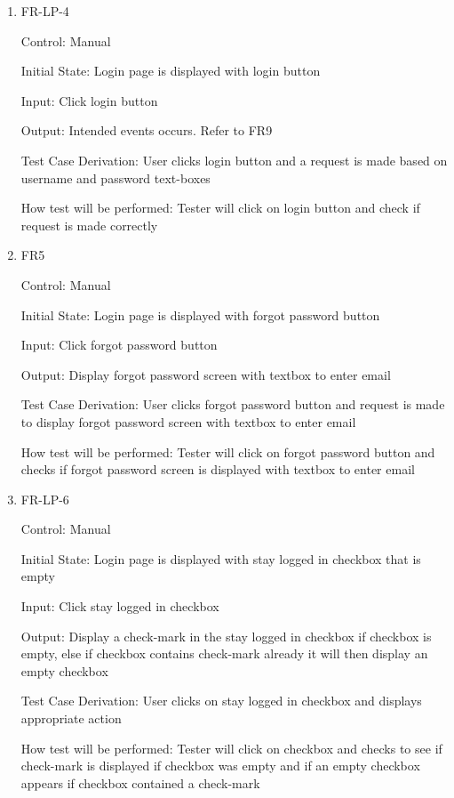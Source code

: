 \documentclass[12pt, titlepage]{article}
\begin{document}
\begin{enumerate}
	\item{FR-LP-4\\}
	
	Control: Manual
	
	Initial State: Login page is displayed with login button
	
	Input: Click login button
	
	Output: Intended events occurs. Refer to FR9
	
	Test Case Derivation: User clicks login button and a request is made based on username and password text-boxes
	
	How test will be performed: Tester will click on login button and check if request is made correctly
	
	\item{FR5\\}
	
	Control: Manual
	
	Initial State: Login page is displayed with forgot password button
	
	Input: Click forgot password button
	
	Output: Display forgot password screen with textbox to enter email
	
	Test Case Derivation: User clicks forgot password button and request is made to display forgot password screen with textbox to enter email
	
	How test will be performed: Tester will click on forgot password button and checks if forgot password screen is displayed with textbox to enter email
	
	\item{FR-LP-6\\}
	
	Control: Manual
	
	Initial State: Login page is displayed with stay logged in checkbox that is empty
	
	Input: Click stay logged in checkbox
	
	Output: Display a check-mark in the stay logged in checkbox if checkbox is empty, else if checkbox contains check-mark already it will then display an empty checkbox
	
	Test Case Derivation: User clicks on stay logged in checkbox and displays appropriate action
	
	How test will be performed: Tester will click on checkbox and checks to see if check-mark is displayed if checkbox was empty and if an empty checkbox appears if checkbox contained a check-mark
	

\end{enumerate}
\end{document}
